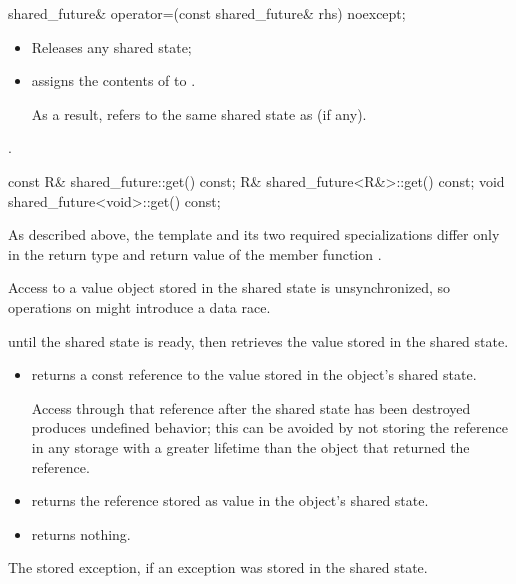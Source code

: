 %
\begin{itemdecl}
shared_future& operator=(const shared_future& rhs) noexcept;
\end{itemdecl}

\begin{itemdescr}
\pnum
\effects
\begin{itemize}
\item
Releases any shared state;
\item
assigns the contents of  to .
\begin{note}
As a result,
 refers to the same shared state as 
(if any).
\end{note}
\end{itemize}

\pnum
\ensures
{}.
\end{itemdescr}

%
\begin{itemdecl}
const R& shared_future::get() const;
R& shared_future<R&>::get() const;
void shared_future<void>::get() const;
\end{itemdecl}

\begin{itemdescr}
\pnum
\begin{note}
As described above, the template and its two required specializations differ only in
the return type and return value of the member function .
\end{note}

\pnum
\begin{note}
Access to a value object stored in the shared state is
unsynchronized, so operations on  might
introduce a data race.
\end{note}

\pnum
\effects
{} until the shared state is ready, then retrieves the
value stored in the shared state.

\pnum
\returns
\begin{itemize}
\item
{} returns a const reference to the value stored in the object's
shared state.
\begin{note}
Access through that reference after the shared state has been
destroyed produces undefined behavior; this can be avoided by not storing the reference in any
storage with a greater lifetime than the  object that returned the
reference.
\end{note}

\item
{} returns the reference stored as value in the object's
shared state.

\item
{} returns nothing.
\end{itemize}

\pnum
\throws
The stored exception, if an exception was stored in the shared state.
\end{itemdescr}


